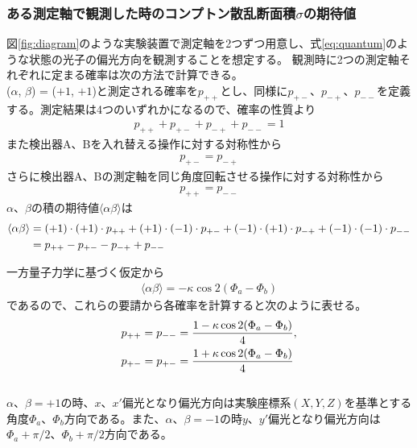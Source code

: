 \documentclass[../../main.tex]{subfiles}
\numberwithin{equation}{section}
\numberwithin{table}{section}
\numberwithin{figure}{section}
\begin{document}
\subsubsection{ある測定軸で観測した時のコンプトン散乱断面積$\sigma$の期待値}
図\ref{fig:diagram}のような実験装置で測定軸を2つずつ用意し、式\eqref{eq:quantum}のような状態の光子の偏光方向を観測することを想定する。
観測時に2つの測定軸それぞれに定まる確率は次の方法で計算できる。\\

($\alpha$, $\beta$) = ($+1$, $+1$)と測定される確率を$p_{++}$とし、同様に$p_{+-}$、$p_{-+}$、$p_{--}$を定義する。測定結果は4つのいずれかになるので、確率の性質より
\begin{align}
	p_{++} + p_{+-} + p_{-+} + p_{--} = 1
\end{align}
また検出器A、Bを入れ替える操作に対する対称性から
\begin{align}
	p_{+-} = p_{-+}
\end{align}
さらに検出器A、Bの測定軸を同じ角度回転させる操作に対する対称性から
\begin{align}
	p_{++} = p_{--}
\end{align}
$\alpha$、$\beta$の積の期待値$\langle \alpha \beta \rangle$は
\begin{align}
	\langle \alpha \beta \rangle 
	&= (+1) \cdot (+1) \cdot p_{++} + (+1) \cdot (-1) \cdot p_{+-} + (-1) \cdot (+1) \cdot p_{-+} + (-1) \cdot (-1) \cdot p_{--} \notag \\
	&= p_{++} -p_{+-} -p_{-+} +p_{--}
\end{align}

一方量子力学に基づく仮定から
\begin{align}
  \langle \alpha \beta \rangle= -\kappa \cos 2(\Phi_a- \Phi_b)
\end{align}
であるので、これらの要請から各確率を計算すると次のように表せる。
\begin{align}
	p_{++} = p_{--} &= \frac{1 -\kappa \cos 2(\Phi_a -\Phi_b)}{4}, \notag \\
	p_{+-} = p_{+-} &= \frac{1 +\kappa \cos 2(\Phi_a -\Phi_b)}{4}
\end{align} \\

$\alpha$、$\beta=+1$の時、$x$、$x'$偏光となり偏光方向は実験座標系$(X,Y,Z)$を基準とする角度$\Phi_a$、$\Phi_b$方向である。また、$\alpha$、$\beta=-1$の時$y$、$y'$偏光となり偏光方向は$\Phi_a + \pi/2$、$\Phi_b + \pi/2$方向である。
\end{document}
